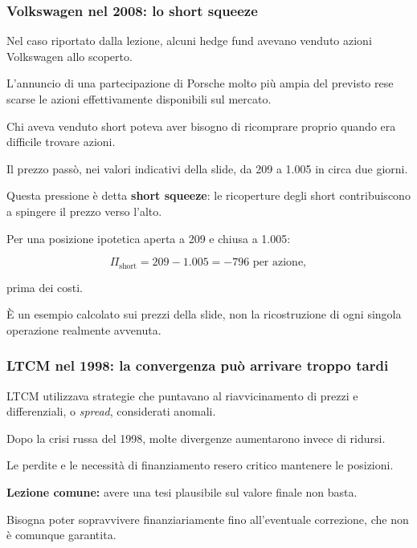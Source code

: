 \subsubsection*{Volkswagen nel 2008:
lo short squeeze}

\noindent Nel caso riportato dalla lezione,
alcuni hedge fund avevano venduto
azioni Volkswagen allo scoperto.

\noindent L'annuncio di una partecipazione
di Porsche molto più ampia del previsto
rese scarse le azioni effettivamente
disponibili sul mercato.

\medskip

\noindent Chi aveva venduto short
poteva aver bisogno di ricomprare
proprio quando era difficile
trovare azioni.

\noindent Il prezzo passò,
nei valori indicativi della slide,
da 209 a 1.005 in circa due giorni.

\noindent Questa pressione è detta
\textbf{short squeeze}:
le ricoperture degli short
contribuiscono a spingere
il prezzo verso l'alto.

\medskip

\noindent Per una posizione ipotetica
aperta a 209 e chiusa a 1.005:

\[
\Pi_{\mathrm{short}}
=
209-1.005
=
\boxed{-796\text{ per azione}},
\]

\noindent prima dei costi.

\noindent È un esempio calcolato
sui prezzi della slide,
non la ricostruzione di ogni singola
operazione realmente avvenuta.


\subsubsection*{LTCM nel 1998:
la convergenza può arrivare troppo tardi}

\noindent LTCM utilizzava strategie
che puntavano al riavvicinamento
di prezzi e differenziali,
o \textit{spread},
considerati anomali.

\noindent Dopo la crisi russa del 1998,
molte divergenze aumentarono
invece di ridursi.

\noindent Le perdite e le necessità
di finanziamento resero critico
mantenere le posizioni.

\medskip

\noindent \textbf{Lezione comune:}
avere una tesi plausibile
sul valore finale non basta.

\noindent Bisogna poter sopravvivere
finanziariamente fino all'eventuale correzione,
che non è comunque garantita.


